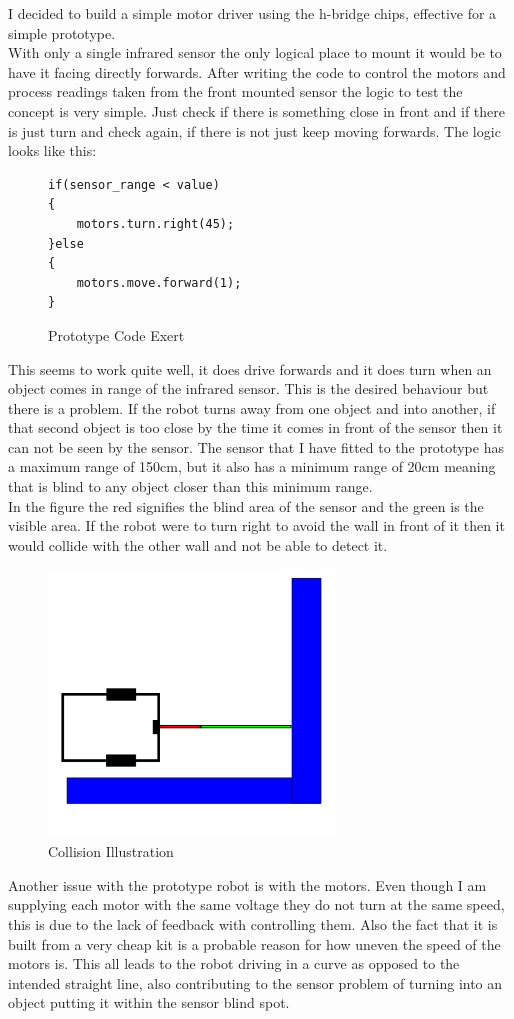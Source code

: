 I decided to build a simple motor driver using the h-bridge chips, effective for a simple prototype.
\\With only a single infrared sensor the only logical place to mount it would be to have it facing directly forwards.  After writing the code to control the motors and process readings taken from the front mounted sensor the logic to test the concept is very simple.  Just check if there is something close in front and if there is just turn and check again, if there is not just keep moving forwards.
The logic looks like this:
\begin{figure}[H]
\begin{lstlisting}[basicstyle=\ttfamily]
if(sensor_range < value)
{
	motors.turn.right(45);
}else
{
	motors.move.forward(1);
}
\end{lstlisting}
\caption{Prototype Code Exert}
\label{Prototype Code Exert}
\end{figure}
This seems to work quite well, it does drive forwards and it does turn when an object comes in range of the infrared sensor.  This is the desired behaviour but there is a problem.  If the robot turns away from one object and into another, if that second object is too close by the time it comes in front of the sensor then it can not be seen by the sensor.  The sensor that I have fitted to the prototype has a maximum range of 150cm, but it also has a minimum range of 20cm meaning that is blind to any object closer than this minimum range.
\\In the figure the red signifies the blind area of the sensor and the green is the visible area.  If the robot were to turn right to avoid the wall in front of it then it would collide with the other wall and not be able to detect it.
\begin{figure}[H]
\centering
        \includegraphics[width=3.0in]  {Images/ir-demo.png}
        \caption{Collision Illustration}
        \label{Collision Illustration}
\end{figure}
Another issue with the prototype robot is with the motors.  Even though I am supplying each motor with the same voltage they do not turn at the same speed, this is due to the lack of feedback with controlling them.  Also the fact that it is built from a very cheap kit is a probable reason for how uneven the speed of the motors is.  This all leads to the robot driving in a curve as opposed to the intended straight line, also contributing to the sensor problem of turning into an object putting it within the sensor blind spot.
